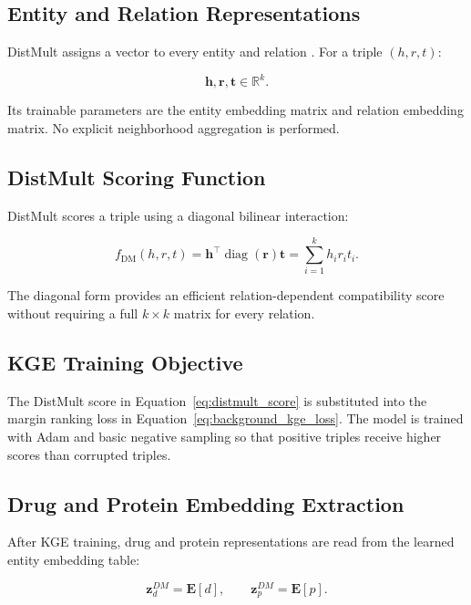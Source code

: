 \subsection{Entity and Relation Representations}

DistMult assigns a vector to every entity and relation
\cite{yang2015embedding}. For a triple $(h,r,t)$:

\begin{equation}
    \mathbf{h},\mathbf{r},\mathbf{t}
    \in
    \mathbb{R}^{k}.
\end{equation}

Its trainable parameters are the entity embedding matrix and relation
embedding matrix. No explicit neighborhood aggregation is performed.

\subsection{DistMult Scoring Function}

DistMult scores a triple using a diagonal bilinear interaction:

\begin{equation}
    f_{\mathrm{DM}}(h,r,t)
    =
    \mathbf{h}^{\top}
    \operatorname{diag}(\mathbf{r})
    \mathbf{t}
    =
    \sum_{i=1}^{k}h_i r_i t_i.
    \label{eq:distmult_score}
\end{equation}

The diagonal form provides an efficient relation-dependent compatibility score
without requiring a full $k\times k$ matrix for every relation.

\subsection{KGE Training Objective}

The DistMult score in Equation~\ref{eq:distmult_score} is substituted into the
margin ranking loss in Equation~\ref{eq:background_kge_loss}. The model is
trained with Adam and basic negative sampling so that positive triples receive
higher scores than corrupted triples.

\subsection{Drug and Protein Embedding Extraction}

After KGE training, drug and protein representations are read from the learned
entity embedding table:

\begin{equation}
    \mathbf{z}_{d}^{DM}=\mathbf{E}[d],
    \qquad
    \mathbf{z}_{p}^{DM}=\mathbf{E}[p].
\end{equation}

